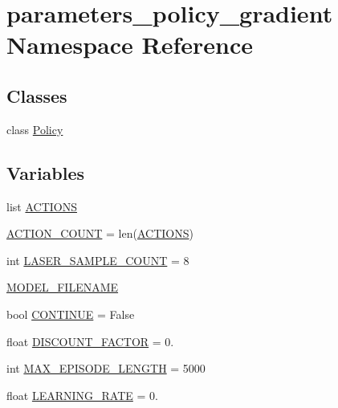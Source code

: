 \hypertarget{namespaceparameters__policy__gradient}{}\section{parameters\+\_\+policy\+\_\+gradient Namespace Reference}
\label{namespaceparameters__policy__gradient}
\subsection*{Classes}
\begin{DoxyCompactItemize}
\item 
class \hyperlink{classparameters__policy__gradient_1_1_policy}{Policy}
\end{DoxyCompactItemize}
\subsection*{Variables}
\begin{DoxyCompactItemize}
\item 
list \hyperlink{namespaceparameters__policy__gradient_a14a6aa5c85bbb1f0a5eebce843788071}{A\+C\+T\+I\+O\+NS}
\item 
\hyperlink{namespaceparameters__policy__gradient_a96a0f11e2c0420498ae8bec147f751e2}{A\+C\+T\+I\+O\+N\+\_\+\+C\+O\+U\+NT} = len(\hyperlink{namespaceparameters__policy__gradient_a14a6aa5c85bbb1f0a5eebce843788071}{A\+C\+T\+I\+O\+NS})
\item 
int \hyperlink{namespaceparameters__policy__gradient_acea8a7d0e95a1d026dae15a1ff4d521c}{L\+A\+S\+E\+R\+\_\+\+S\+A\+M\+P\+L\+E\+\_\+\+C\+O\+U\+NT} = 8
\item 
\hyperlink{namespaceparameters__policy__gradient_aaaa453efd9a7edd9430dc0b42be292cd}{M\+O\+D\+E\+L\+\_\+\+F\+I\+L\+E\+N\+A\+ME}
\item 
bool \hyperlink{namespaceparameters__policy__gradient_a1dfc560f0fb66eabf7e4a49aec538e18}{C\+O\+N\+T\+I\+N\+UE} = False
\item 
float \hyperlink{namespaceparameters__policy__gradient_a9e7210a90cbe951d94d387097fdfe89f}{D\+I\+S\+C\+O\+U\+N\+T\+\_\+\+F\+A\+C\+T\+OR} = 0.
\item 
int \hyperlink{namespaceparameters__policy__gradient_a54b6f1ddc58786a7b9153e81c257248d}{M\+A\+X\+\_\+\+E\+P\+I\+S\+O\+D\+E\+\_\+\+L\+E\+N\+G\+TH} = 5000
\item 
float \hyperlink{namespaceparameters__policy__gradient_ad52de60b86e5029686ccf389f4b19500}{L\+E\+A\+R\+N\+I\+N\+G\+\_\+\+R\+A\+TE} = 0.
\end{DoxyCompactItemize}


